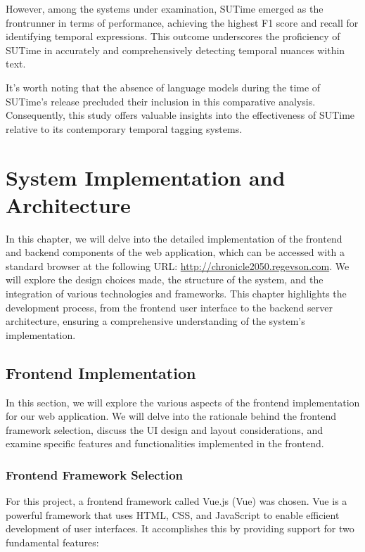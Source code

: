 \documentclass[a4paper,10pt]{report} %
\begin{document}
However, among the systems under examination, SUTime emerged as the frontrunner in terms of performance, achieving the highest F1 score and recall for identifying temporal expressions. This outcome underscores the proficiency of SUTime in accurately and comprehensively detecting temporal nuances within text.

It's worth noting that the absence of language models during the time of SUTime's release precluded their inclusion in this comparative analysis. Consequently, this study offers valuable insights into the effectiveness of SUTime relative to its contemporary temporal tagging systems.


\chapter{System Implementation and Architecture}
In this chapter, we will delve into the detailed implementation of the frontend and backend components of the web application, which can be accessed with a standard browser at the following URL: \url{http://chronicle2050.regevson.com}. We will explore the design choices made, the structure of the system, and the integration of various technologies and frameworks. This chapter highlights the development process, from the frontend user interface to the backend server architecture, ensuring a comprehensive understanding of the system's implementation.

\section{Frontend Implementation}
In this section, we will explore the various aspects of the frontend implementation for our web application. We will delve into the rationale behind the frontend framework selection, discuss the UI design and layout considerations, and examine specific features and functionalities implemented in the frontend.

\subsection{Frontend Framework Selection}
For this project, a frontend framework called Vue.js (Vue) was chosen. Vue is a powerful framework that uses HTML, CSS, and JavaScript to enable efficient development of user interfaces. It accomplishes this by providing support for two fundamental features:
\end{document}
